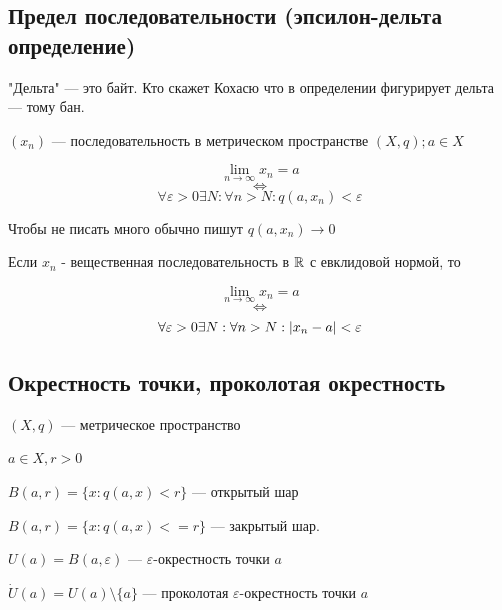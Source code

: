 \subsection{Предел последовательности (эпсилон-дельта определение)}
\begin{remark}
"Дельта" --- это байт. Кто скажет Кохасю что в определении фигурирует дельта --- тому бан.
\end{remark}
    \begin{definition}
        $(x_n)$ --- последовательность в метрическом пространстве $(X,
        q); a \in X$
        
        $$\displaystyle \lim_{n \to \infty}{x_n} = a$$ $$\Leftrightarrow$$
        $$\forall \varepsilon > 0 \exists 
        N : \forall n > N: q(a, x_n) < \varepsilon$$
        \begin{remark}
        Чтобы не писать много обычно пишут $q(a, x_n) \to 0$
        \end{remark}
        
        
    \end{definition}
    \begin{remark}
        Если $x_n$ - вещественная последовательность в $\operatorname*{\mathbb{R}}$ с евклидовой нормой, то
        
       $$\displaystyle \lim_{n \to \infty}{x_n} = a$$ $$\Leftrightarrow$$
        $$\forall \varepsilon > 0 \exists N : \forall n > N: \left| x_n - a \right|< \varepsilon$$
    \end{remark}
\newpage
\subsection{Окрестность точки, проколотая окрестность}
\begin{definition}
    $(X, q)$ --- метрическое пространство
    
    $a \in X, r > 0$ 
    
    $B(a,r) = \{ x : q(a,x) < r\}$ --- открытый шар
    
    $B(a,r) = \{ x : q(a,x) <= r\}$ --- закрытый шар.
    
    $U(a) = B(a, \varepsilon)$ --- $\varepsilon$-окрестность точки $a$
    
    $\dot{U}(a) = U(a) \setminus \{a\}$ --- проколотая $\varepsilon$-окрестность точки $a$
\end{definition}
\newpage
